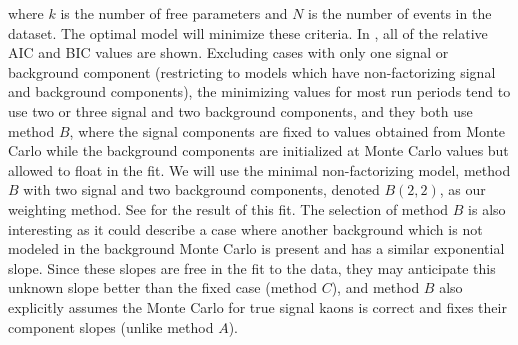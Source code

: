 where $k$ is the number of free parameters and $N$ is the number of events in the dataset. The optimal model will minimize these criteria. In , all of the relative AIC and BIC values are shown. Excluding cases with only one signal or background component (restricting to models which have non-factorizing signal and background components), the minimizing values for most run periods tend to use two or three signal and two background components, and they both use method $B$, where the signal components are fixed to values obtained from Monte Carlo while the background components are initialized at Monte Carlo values but allowed to float in the fit. We will use the minimal non-factorizing model, method $B$ with two signal and two background components, denoted $B(2,2)$, as our weighting method. See  for the result of this fit. The selection of method $B$ is also interesting as it could describe a case where another background which is not modeled in the background Monte Carlo is present and has a similar exponential slope. Since these slopes are free in the fit to the data, they may anticipate this unknown slope better than the fixed case (method $C$), and method $B$ also explicitly assumes the Monte Carlo for true signal kaons is correct and fixes their component slopes (unlike method $A$).

